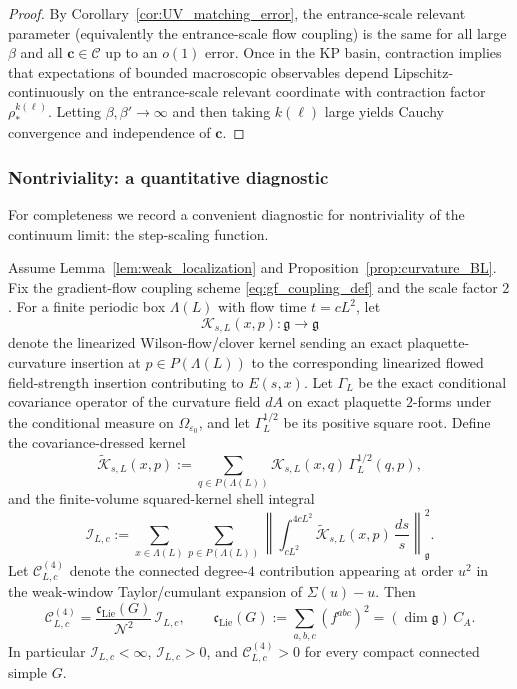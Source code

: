 \begin{proof}
By Corollary~\ref{cor:UV_matching_error}, the entrance-scale relevant parameter (equivalently the entrance-scale flow coupling) is the same for all
large $\beta$ and all $\mathbf c\in\mathcal C$ up to an $o(1)$ error.
Once in the KP basin, contraction implies that expectations of bounded macroscopic observables depend Lipschitz-continuously on the entrance-scale
relevant coordinate with contraction factor $\rho_*^{k(\ell)}$.
Letting $\beta,\beta'\to\infty$ and then taking $k(\ell)$ large yields Cauchy convergence and independence of $\mathbf c$.
\end{proof}


\subsubsection{Nontriviality: a quantitative diagnostic}
\label{subsec:nontriviality}

For completeness we record a convenient diagnostic for nontriviality of the continuum limit: the step-scaling function.

\begin{theorem}\label{thm:b0_coefficient_extraction}
Assume Lemma~\ref{lem:weak_localization} and Proposition~\ref{prop:curvature_BL}.
Fix the gradient-flow coupling scheme \eqref{eq:gf_coupling_def} and the scale factor $2$.
For a finite periodic box $\Lambda(L)$ with flow time $t=cL^2$, let
\[
\mathcal K_{s,L}(x,p):\mathfrak g\to \mathfrak g
\]
denote the linearized Wilson-flow/clover kernel sending an exact plaquette-curvature insertion at $p\in P(\Lambda(L))$
to the corresponding linearized flowed field-strength insertion contributing to $E(s,x)$.
Let $\Gamma_L$ be the exact conditional covariance operator of the curvature field $dA$ on exact plaquette $2$-forms under the conditional measure on $\Omega_{\varepsilon_0}$, and let $\Gamma_L^{1/2}$ be its positive square root.
Define the covariance-dressed kernel
\[
\widetilde{\mathcal K}_{s,L}(x,p)
:= \sum_{q\in P(\Lambda(L))}\mathcal K_{s,L}(x,q)\,\Gamma_L^{1/2}(q,p),
\]
and the finite-volume squared-kernel shell integral
\begin{equation}\label{eq:b0_shell_integral}
\mathcal I_{L,c}
:=
\sum_{x\in \Lambda(L)}\sum_{p\in P(\Lambda(L))}
\left\|\int_{cL^2}^{4cL^2}\widetilde{\mathcal K}_{s,L}(x,p)\,\frac{ds}{s}\right\|_{\mathfrak g}^{2}.
\end{equation}
Let $\mathcal C^{(4)}_{L,c}$ denote the connected degree-$4$ contribution appearing at order $u^2$ in the weak-window Taylor/cumulant expansion of $\Sigma(u)-u$.
Then
\begin{equation}\label{eq:b0_shell_coefficient}
\mathcal C^{(4)}_{L,c}
=
\frac{\mathfrak c_{\mathrm{Lie}}(G)}{\mathcal N^2}\,\mathcal I_{L,c},
\qquad
\mathfrak c_{\mathrm{Lie}}(G):=\sum_{a,b,c}(f^{abc})^2=(\dim \mathfrak g)\,C_A.
\end{equation}
In particular $\mathcal I_{L,c}<\infty$, $\mathcal I_{L,c}>0$, and $\mathcal C^{(4)}_{L,c}>0$ for every compact connected simple $G$.
\end{theorem}

